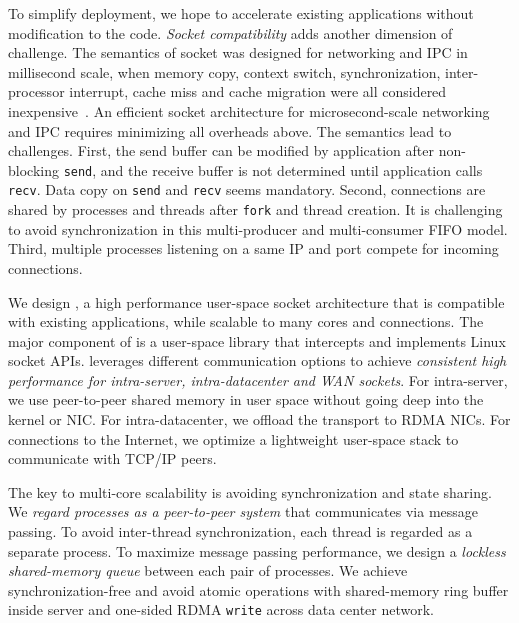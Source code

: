 
To simplify deployment, we hope to accelerate existing applications without modification to the code. \textit{Socket compatibility} adds another dimension of challenge. The semantics of socket was designed for networking and IPC in millisecond scale, when memory copy, context switch, synchronization, inter-processor interrupt, cache miss and cache migration were all considered inexpensive~\cite{barroso2017attack}. An efficient socket architecture for microsecond-scale networking and IPC requires minimizing all overheads above. The semantics lead to challenges. First, the send buffer can be modified by application after non-blocking \texttt{send}, and the receive buffer is not determined until application calls \texttt{recv}. Data copy on \texttt{send} and \texttt{recv} seems mandatory. Second, connections are shared by processes and threads after \texttt{fork} and thread creation. It is challenging to avoid synchronization in this multi-producer and multi-consumer FIFO model. Third, multiple processes listening on a same IP and port compete for incoming connections.


We design \sys{}, a high performance user-space socket architecture that is compatible with existing applications, while scalable to many cores and connections. The major component of \sys{} is a user-space library \libipc{} that intercepts and implements Linux socket APIs. \libipc{} leverages different communication options to achieve \textit{consistent high performance for intra-server, intra-datacenter and WAN sockets}. For intra-server, we use peer-to-peer shared memory in user space without going deep into the kernel or NIC. For intra-datacenter, we offload the transport to RDMA NICs. For connections to the Internet, we optimize a lightweight user-space stack to communicate with TCP/IP peers.

The key to multi-core scalability is avoiding synchronization and state sharing. We \textit{regard processes as a peer-to-peer system} that communicates via message passing. To avoid inter-thread synchronization, each thread is regarded as a separate process. To maximize message passing performance, we design a \textit{lockless shared-memory queue} between each pair of processes. We achieve synchronization-free and avoid atomic operations with shared-memory ring buffer inside server and one-sided RDMA \texttt{write} across data center network.

